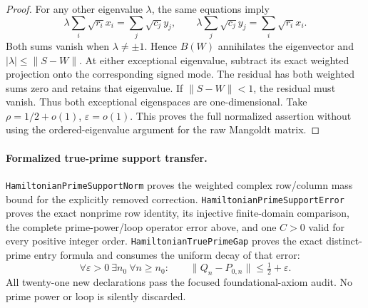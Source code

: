 \begin{proof}
For any other eigenvalue \(\lambda\), the same equations imply
\[
 \lambda\sum_i\sqrt{r_i}x_i=\sum_j\sqrt{c_j}y_j,\qquad
 \lambda\sum_j\sqrt{c_j}y_j=\sum_i\sqrt{r_i}x_i.
\]
Both sums vanish when \(\lambda\ne\pm1\).
Hence \(B(W)\) annihilates the eigenvector and
\(|\lambda|\leq\|S-W\|\).
At either exceptional eigenvalue, subtract its exact weighted
projection onto the corresponding signed mode.
The residual has both weighted sums zero and retains that
eigenvalue. If \(\|S-W\|<1\), the residual must vanish.
Thus both exceptional eigenspaces are one-dimensional.
Take \(\rho=1/2+o(1)\), \(\varepsilon=o(1)\).
This proves the full normalized assertion without using the
ordered-eigenvalue argument for the raw Mangoldt matrix.
\end{proof}

\paragraph{Formalized true-prime support transfer.}
\texttt{HamiltonianPrimeSupportNorm} proves the weighted complex
row/column mass bound for the explicitly removed correction.
\texttt{HamiltonianPrimeSupportError} proves the exact nonprime
row identity, its injective finite-domain comparison, the complete
prime-power/loop operator error above, and one \(C>0\) valid
for every positive integer order.
\texttt{HamiltonianTruePrimeGap} proves the exact distinct-prime
entry formula and consumes the uniform decay of that error:
\[
 \forall\varepsilon>0\ \exists n_0\
 \forall n\geq n_0:\qquad
       \|Q_n-P_{0,n}\|\leq\tfrac12+\varepsilon .
\]
All twenty-one new declarations pass the focused foundational-axiom
audit. No prime power or loop is silently discarded.

